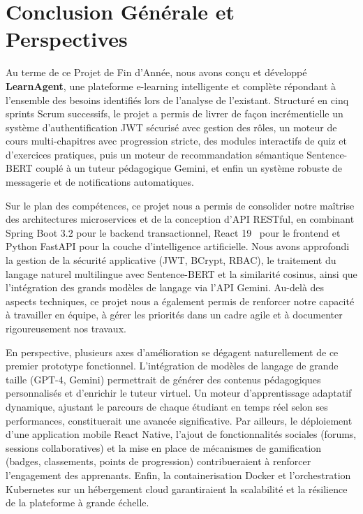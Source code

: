 \documentclass[12pt,a4paper]{report}
\begin{document}
\newpage

\chapter*{Conclusion Générale et Perspectives}

Au terme de ce Projet de Fin d'Année, nous avons conçu et développé \textbf{LearnAgent}, une plateforme e-learning intelligente et complète répondant à l'ensemble des besoins identifiés lors de l'analyse de l'existant. Structuré en cinq sprints Scrum successifs, le projet a permis de livrer de façon incrémentielle un système d'authentification JWT sécurisé avec gestion des rôles, un moteur de cours multi-chapitres avec progression stricte, des modules interactifs de quiz et d'exercices pratiques, puis un moteur de recommandation sémantique Sentence-BERT couplé à un tuteur pédagogique Gemini, et enfin un système robuste de messagerie et de notifications automatiques.

Sur le plan des compétences, ce projet nous a permis de consolider notre maîtrise des architectures microservices et de la conception d'API RESTful, en combinant Spring Boot 3.2 pour le backend transactionnel, React 19~\cite{react} pour le frontend et Python FastAPI pour la couche d'intelligence artificielle. Nous avons approfondi la gestion de la sécurité applicative (JWT, BCrypt, RBAC), le traitement du langage naturel multilingue avec Sentence-BERT et la similarité cosinus, ainsi que l'intégration des grands modèles de langage via l'API Gemini. Au-delà des aspects techniques, ce projet nous a également permis de renforcer notre capacité à travailler en équipe, à gérer les priorités dans un cadre agile et à documenter rigoureusement nos travaux.

En perspective, plusieurs axes d'amélioration se dégagent naturellement de ce premier prototype fonctionnel. L'intégration de modèles de langage de grande taille (GPT-4, Gemini) permettrait de générer des contenus pédagogiques personnalisés et d'enrichir le tuteur virtuel. Un moteur d'apprentissage adaptatif dynamique, ajustant le parcours de chaque étudiant en temps réel selon ses performances, constituerait une avancée significative. Par ailleurs, le déploiement d'une application mobile React Native, l'ajout de fonctionnalités sociales (forums, sessions collaboratives) et la mise en place de mécanismes de gamification (badges, classements, points de progression) contribueraient à renforcer l'engagement des apprenants. Enfin, la containerisation Docker et l'orchestration Kubernetes sur un hébergement cloud garantiraient la scalabilité et la résilience de la plateforme à grande échelle.
\end{document}
